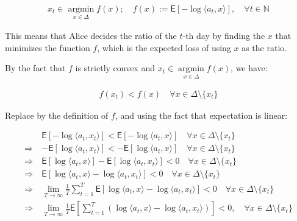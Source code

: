 \documentclass{article}
\begin{document}
\begin{align*}
    x_{t} \in \underset{x \in \Delta}{\operatorname{argmin}} f (x); \quad f (x) := \mathsf{E} \left[ - \log \langle a_t, x \rangle \right] , \quad \forall t \in \mathbb{N} 
\end{align*}

This means that Alice decides the ratio of the $t$-th day by finding the $x$ that minimizes the function $f$, which is the expected loss of using $x$ as the ratio.
\bigskip

\begin{comment}
Since $(1)$ is the expected value of the sum over $T$ days, we can divide it by $T$ on both sides to get the average per day, and our aim would be proving the following:

\begin{align*}
    \lim_{T \to \infty} \frac{1}{T} \mathsf{E} \left[ \sum_{t = 1}^T \left( \log \langle a_t, x \rangle - \log \langle a_t, x_t \rangle \right) \right] \leq 0 ,  \quad \forall x \in \Delta \tag{2}
\end{align*}
\end{comment}

By the fact that $f$ is strictly convex and $x_{t} \in \underset{x \in \Delta}{\operatorname{argmin}} f (x)$, we have:

\begin{align*}
    f (x_t) < f (x) \quad \forall x \in \Delta \setminus \{ x_t \} 
\end{align*}

Replace by the definition of $f$, and using the fact that expectation is linear:

\begin{align*}
    &\mathsf{E} \left[ - \log \langle a_t, x_t \rangle \right] < \mathsf{E} \left[ - \log \langle a_t, x \rangle \right] \quad \forall x \in \Delta \setminus \{ x_t \} \\
    \Rightarrow \ &- \mathsf{E} \left[ \log \langle a_t, x_t \rangle \right] < - \mathsf{E} \left[ \log \langle a_t, x \rangle \right] \quad \forall x \in \Delta \setminus \{ x_t \} \\
    \Rightarrow \ &\mathsf{E} \left[ \log \langle a_t, x \rangle \right] - \mathsf{E} \left[ \log \langle a_t, x_t \rangle \right] < 0 \quad \forall x \in \Delta \setminus \{ x_t \} \\
    \Rightarrow \ &\mathsf{E} \left[ \log \langle a_t, x \rangle - \log \langle a_t, x_t \rangle \right] < 0 \quad \forall x \in \Delta \setminus \{ x_t \} \\
    \Rightarrow \ &\lim_{T \to \infty} \frac{1}{T} \sum_{t = 1}^T \mathsf{E} \left[ \log \langle a_t, x \rangle - \log \langle a_t, x_t \rangle \right] < 0 \quad \forall x \in \Delta \setminus \{ x_t \} \\
    \Rightarrow \ &\lim_{T \to \infty} \frac{1}{T} \mathsf{E} \left[ \sum_{t = 1}^T \left( \log \langle a_t, x \rangle - \log \langle a_t, x_t \rangle \right) \right] < 0 ,  \quad \forall x \in \Delta \setminus \{ x_t \}
\end{align*}
\end{document}
